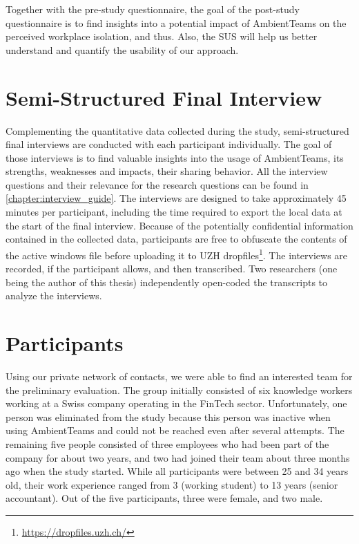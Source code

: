 Together with the pre-study questionnaire, the goal of the post-study questionnaire is to find insights into a potential impact of AmbientTeams on the perceived workplace isolation, and thus. Also, the SUS will help us better understand and quantify the usability of our approach.

\section{Semi-Structured Final Interview}
\label{section:interview}
Complementing the quantitative data collected during the study, semi-structured final interviews are conducted with each participant individually. The goal of those interviews is to find valuable insights into the usage of AmbientTeams, its strengths, weaknesses and impacts, their sharing behavior. All the interview questions and their relevance for the research questions can be found in \autoref{chapter:interview_guide}. The interviews are designed to take approximately 45 minutes per participant, including the time required to export the local data at the start of the final interview. Because of the potentially confidential information contained in the collected data, participants are free to obfuscate the contents of the active windows file before uploading it to UZH dropfiles\footnote{\url{https://dropfiles.uzh.ch/}}. The interviews are recorded, if the participant allows, and then transcribed. Two researchers (one being the author of this thesis) independently open-coded the transcripts to analyze the interviews.

\section{Participants}
Using our private network of contacts, we were able to find an interested team for the preliminary evaluation. The group initially consisted of six knowledge workers working at a Swiss company operating in the FinTech sector. Unfortunately, one person was eliminated from the study because this person was inactive when using AmbientTeams and could not be reached even after several attempts. The remaining five people consisted of three employees who had been part of the company for about two years, and two had joined their team about three months ago when the study started. While all participants were between 25 and 34 years old, their work experience ranged from 3 (working student) to 13 years (senior accountant). Out of the five participants, three were female, and two male.